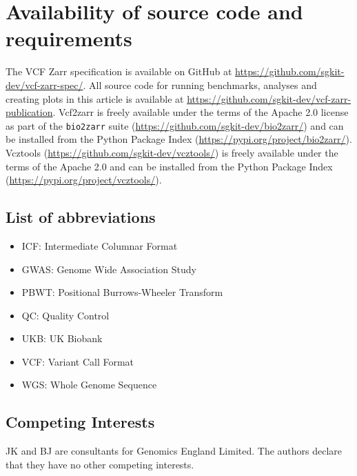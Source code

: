 \documentclass[a4paper,num-refs]{oup-contemporary}
\begin{document}
\section{Availability of source code and requirements}

The VCF Zarr specification is available on GitHub at
\url{https://github.com/sgkit-dev/vcf-zarr-spec/}.
All source code for running benchmarks, analyses and creating
plots in this article is available at
\url{https://github.com/sgkit-dev/vcf-zarr-publication}.
Vcf2zarr is freely available under the terms of the Apache 2.0
license as part of the \texttt{bio2zarr}
suite (\url{https://github.com/sgkit-dev/bio2zarr/})
and can be installed from the Python Package Index
(\url{https://pypi.org/project/bio2zarr/}).
Vcztools (\url{https://github.com/sgkit-dev/vcztools/})
is freely available under the terms of the Apache 2.0
and can be installed from the Python Package Index
(\url{https://pypi.org/project/vcztools/}).

\subsection{List of abbreviations}

\begin{itemize}
    \item ICF: Intermediate Columnar Format
    \item GWAS: Genome Wide Association Study
    \item PBWT: Positional Burrows-Wheeler Transform
    \item QC: Quality Control
    \item UKB: UK Biobank
    \item VCF: Variant Call Format
    \item WGS: Whole Genome Sequence
\end{itemize}

\subsection{Competing Interests}
JK and BJ are consultants for Genomics England Limited.
The authors declare that they have no other competing interests.
\end{document}
